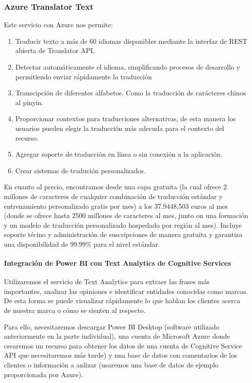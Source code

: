 \documentclass[english,runningheads,a4paper]{llncs}[2018/03/10]
\begin{document}
    \subsubsection{Azure Translator Text}
    Este servicio con Azure nos permite:
    \begin{enumerate}
        \item Traducir texto a más de 60 idiomas disponibles mediante la 
        interfaz de REST abierta de Translator API.
        \item Detectar automáticamente el idioma, simplificando procesos de 
        desarrollo y permitiendo enviar rápidamente la traducción
        \item Transcipción de diferentes alfabetos. Como la traducción de 
        carácteres chinos al pinyin.
        \item Proporcionar contextos para traducciones alternativas, de esta 
        manera los usuarios pueden elegir la traducción más adecuda para el 
        contexto del recurso.
        \item Agregar soporte de traducción en línea o sin conexión a la 
        aplicación.
        \item Crear sistemas de tradución personalizados.
    \end{enumerate}{}
    En cuanto al precio, encontramos desde una capa gratuita (la cual ofrece 2 
    millones de caracteres de cualquier combinación de traducción estándar y 
    entrenamiento personalizado gratis por mes) a los 37.9448,503 euros al mes 
    (donde se ofrece hasta 2500 millones de caracteres al mes, junto on una 
    formación y un modelo de traducción personalizado hospedado por región al 
    mes). Incluye soporte técino y administración de suscripciones de manera 
    gratuita y garantiza una disponibilidad de 99.99\% para el nivel estándar.
    
    \paragraph{Integración de Power BI con Text Analytics de Cognitive Services}
    Utilizaremos el servicio de Text Analytics para extraer las frases más 
    importantes, analizar las opiniones e identificar entidades conocidas como 
    marcas. De esta forma se puede visualizar rápidamente lo que hablan los 
    clientes acerca de nuestra marca o cómo se sienten al respecto.
    
    Para ello, necesitaremos descargar Power BI Desktop (software utilizado 
    anteriormente en la parte individual), una cuenta de Microsoft Azure donde 
    crearemos un recurso para obtener los datos de una cuenta de Cognitive 
    Service API que necesitaremos más tarde) y una base de datos con 
    comentarios de los clientes o información a anlizar (usaremos una base de 
    datos de ejemplo proporcionada por Azure).
    
\end{document}
